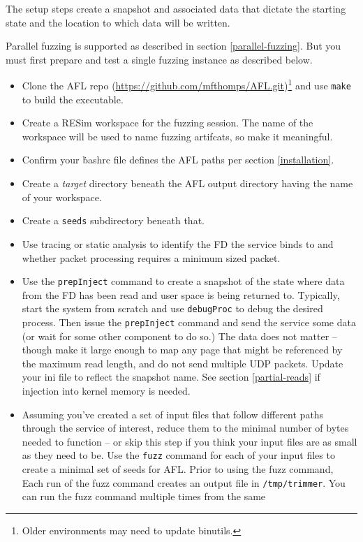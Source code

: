 \documentclass[titlepage]{article}
\begin{document}
The setup steps create a snapshot and associated data that dictate the starting state and the location
to which data will be written.  

Parallel fuzzing is supported as described in section \ref{parallel-fuzzing}.  But you must first prepare and
test a single fuzzing instance as described below.

\begin{itemize}
\item Clone the AFL repo (\url{https://github.com/mfthomps/AFL.git})\footnote{Older environments may need to update binutils.} and use {\tt make} to build the executable.
\item Create a RESim workspace for the fuzzing session.  The name of the workspace will be used
to name fuzzing artifcats, so make it meaningful.
\item Confirm your {\.bashrc} file defines the AFL paths per section \ref{installation}.
\item Create a \textit{target} directory beneath the AFL output directory having the name of your workspace.
\item Create a {\tt seeds} subdirectory beneath that. 
\item Use tracing or static analysis to identify the FD the service binds to and whether packet processing requires a minimum sized packet.
\item Use the {\tt prepInject} command to create a snapshot of the state where data from the FD has been read and user space is being returned to.
Typically, start the system from scratch and use {\tt debugProc} to debug the desired process.  Then issue the {\tt prepInject} command and
send the service some data (or wait for some other component to do so.)  The data does not matter -- though make it large enough
to map any page that might be referenced by the maximum read length, and do not send multiple UDP packets.  Update your ini file to reflect
the snapshot name.  See section \ref{partial-reads} if injection into kernel memory is needed.
\item Assuming you've created a set of input files that follow different paths through the service of interest, 
reduce them to the minimal number of bytes needed to function -- or skip this step if you think your input files are
as small as they need to be.
Use the {\tt fuzz} command for each of your input files to create a minimal set of seeds for AFL. Prior to using the fuzz command,
Each run of the fuzz command creates an output file in {\tt /tmp/trimmer}.  You can run the fuzz command multiple times from the same 

\end{itemize}
\end{document}

